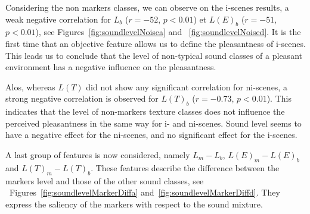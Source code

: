 \documentclass[12pt]{elsarticle}
\newcommand{\cf}{cf.}
\begin{document}
Considering the non markers classes, we can observe on the i-scenes results, a weak negative correlation for $L_b$  ($r=-52$, $p<0.01$) et $L(E)_b$ ($r=-51$, $p<0.01$), see Figures~\ref{fig:soundlevelNoisea}  and ~\ref{fig:soundlevelNoised}. It is the first time that an objective feature allows us to define the pleasantness of i-scenes. This leads us to conclude that the level of non-typical sound classes of a pleasant environment has a negative influence on the pleasantness.


Alos, whereas $L(T)$ did not show any significant correlation for ni-scenes, a strong negative correlation is observed for $L(T)_b$ ($r = -0.73$, $p < 0.01$). This indicates that the level of non-markers texture classes does not influence the perceived pleasantness in the same way for i- and ni-scenes. Sound level seems to have a negative effect for the ni-scenes, and no significant effect for the i-scenes.


A last group of features is now considered, namely $L_m-L_b$, $L(E)_m-L(E)_b$ and $L(T)_m-L(T)_b$.  These features describe the difference between the markers level and those of the other sound classes, see ~Figures~\ref{fig:soundlevelMarkerDiffa} and~\ref{fig:soundlevelMarkerDiffd}. They express the saliency of the markers with respect to the sound mixture.

\end{document}
